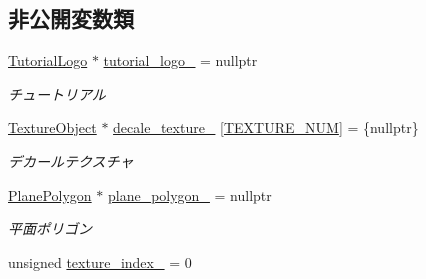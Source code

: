 \subsection*{非公開変数類}
\begin{DoxyCompactItemize}
\item 
\mbox{\hyperlink{class_tutorial_logo}{Tutorial\+Logo}} $\ast$ \mbox{\hyperlink{class_tutorial_logo_draw_ab357c25048d3582466a24234896adf3f}{tutorial\+\_\+logo\+\_\+}} = nullptr
\begin{DoxyCompactList}\small\item\em チュートリアル \end{DoxyCompactList}\item 
\mbox{\hyperlink{class_texture_object}{Texture\+Object}} $\ast$ \mbox{\hyperlink{class_tutorial_logo_draw_afb10b575221308bfb7f86e276086aad6}{decale\+\_\+texture\+\_\+}} \mbox{[}\mbox{\hyperlink{class_tutorial_logo_draw_aff3396323c386d499aa23e5605085ab1}{T\+E\+X\+T\+U\+R\+E\+\_\+\+N\+UM}}\mbox{]} = \{nullptr\}
\begin{DoxyCompactList}\small\item\em デカールテクスチャ \end{DoxyCompactList}\item 
\mbox{\hyperlink{class_plane_polygon}{Plane\+Polygon}} $\ast$ \mbox{\hyperlink{class_tutorial_logo_draw_adc447c252db2d9ab17d72eb783d82432}{plane\+\_\+polygon\+\_\+}} = nullptr
\begin{DoxyCompactList}\small\item\em 平面ポリゴン \end{DoxyCompactList}\item 
unsigned \mbox{\hyperlink{class_tutorial_logo_draw_a1f1d3ebf495bba7bfd86f7b415106144}{texture\+\_\+index\+\_\+}} = 0
\end{DoxyCompactItemize}
